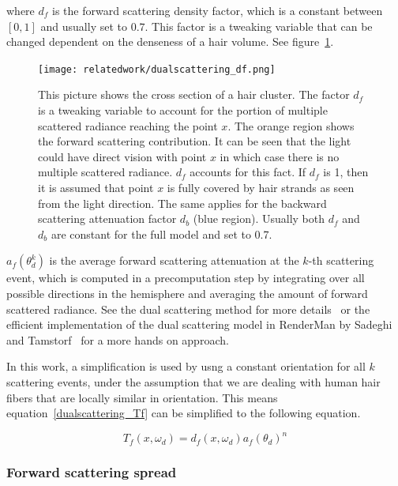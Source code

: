 where $d_f$ is the forward scattering density factor, which is a constant between $[0, 1]$ and usually set to $0.7$. This factor is a tweaking variable that can be changed dependent on the denseness of a hair volume. See figure~\ref{fig_df}.

\begin{figure}[h]
\begin{center}
\texttt{[image: relatedwork/dualscattering\_df.png]}
\end{center}
\caption{This picture shows the cross section of a hair cluster. The factor $d_f$ is a tweaking variable to account for the portion of multiple scattered radiance reaching the point $x$. The orange region shows the forward scattering contribution. It can be seen that the light could have direct vision with point $x$ in which case there is no multiple scattered radiance. $d_f$ accounts for this fact. If $d_f$ is 1, then it is assumed that point $x$ is fully covered by hair strands as seen from the light direction. The same applies for the backward scattering attenuation factor $d_b$ (blue region). Usually both $d_f$ and $d_b$ are constant for the full model and set to 0.7.}
\label{fig_df}
\end{figure}


$a_f(\theta_d^k)$ is the average forward scattering attenuation at the $k$-th scattering event, which is computed in a precomputation step by integrating over all possible directions in the hemisphere and averaging the amount of forward scattered radiance. See the dual scattering method for more details~\cite{zinke} or the efficient implementation of the dual scattering model in RenderMan by Sadeghi and Tamstorf~\cite{sadeghi} for a more hands on approach.

In this work, a simplification is used by usng a constant orientation for all $k$ scattering events, under the assumption that we are dealing with human hair fibers that are locally similar in orientation. This means equation~\ref{dualscattering_Tf} can be simplified to the following equation.

\begin{equation}
T_f(x, \omega_d) = d_f(x, \omega_d) a_f(\theta_d)^n
\label{forwardscattering}
\end{equation}

\subsubsection{Forward scattering spread}

